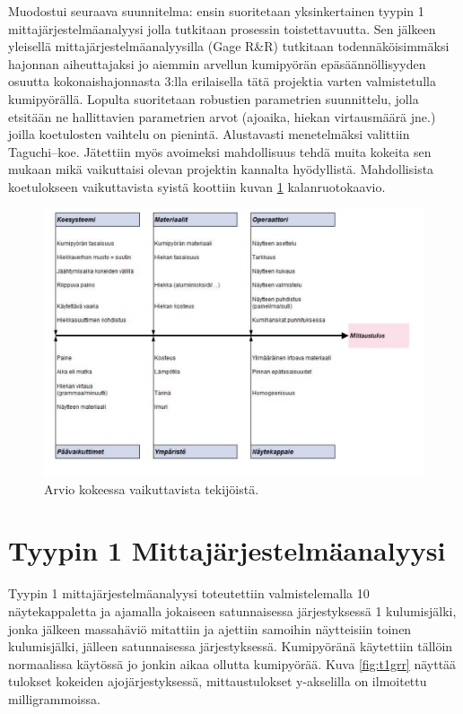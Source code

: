 \documentclass[12pt,a4paper,finnish]{tutthesis}
\begin{document}
Muodostui seuraava suunnitelma: ensin suoritetaan yksinkertainen
tyypin 1 mittajärjestelmäanalyysi jolla tutkitaan
prosessin toistettavuutta. Sen
jälkeen yleisellä mittajärjestelmäanalyysilla (Gage R\&R) tutkitaan
todennäköisimmäksi hajonnan aiheuttajaksi jo aiemmin arvellun kumipyörän
epäsäännöllisyyden osuutta kokonaishajonnasta 3:lla erilaisella tätä
projektia varten valmistetulla kumipyörällä. Lopulta suoritetaan
robustien parametrien suunnittelu, jolla etsitään ne
hallittavien parametrien arvot (ajoaika, hiekan virtausmäärä jne.)
joilla koetulosten vaihtelu on pienintä. Alustavasti menetelmäksi valittiin
Taguchi–koe. Jätettiin myös avoimeksi mahdollisuus tehdä muita
kokeita sen mukaan mikä vaikuttaisi olevan projektin kannalta
hyödyllistä. Mahdollisista koetulokseen vaikuttavista syistä koottiin
kuvan \ref{fig:ruoto1} kalanruotokaavio.

\begin{figure}
  \begin{center}
    \includegraphics[width=1.0\textwidth]{Capture7}
  \end{center}
  \caption[Kalanruotokaavio abraasiokokeesta]{Arvio kokeessa vaikuttavista tekijöistä.}
  \label{fig:ruoto1}
\end{figure}

\section{Tyypin 1 Mittajärjestelmäanalyysi}

Tyypin 1 mittajärjestelmäanalyysi toteutettiin valmistelemalla 10 näytekappaletta ja ajamalla jokaiseen satunnaisessa järjestyksessä 1 kulumisjälki, jonka jälkeen massahäviö mitattiin ja ajettiin samoihin näytteisiin toinen kulumisjälki, jälleen satunnaisessa järjestyksessä. Kumipyöränä käytettiin tällöin
normaalissa käytössä jo jonkin aikaa ollutta kumipyörää.
Kuva \ref{fig:t1grr} näyttää tulokset kokeiden ajojärjestyksessä, mittaustulokset y-akselilla on ilmoitettu milligrammoissa.
\end{document}
